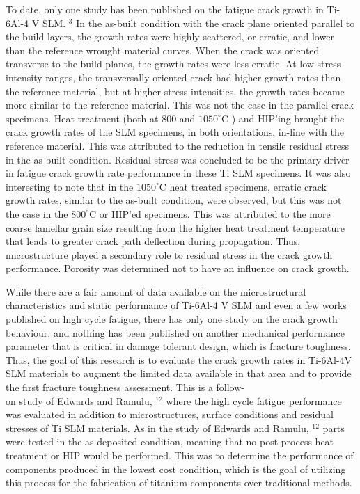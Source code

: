 \documentclass[10pt]{article}
\begin{document}
To date, only one study has been published on the fatigue crack growth in Ti-6Al-4 V SLM. ${ }^{3}$ In the as-built condition with the crack plane oriented parallel to the build layers, the growth rates were highly scattered, or erratic, and lower than the reference wrought material curves. When the crack was oriented transverse to the build planes, the growth rates were less erratic. At low stress intensity ranges, the transversally oriented crack had higher growth rates than the reference material, but at higher stress intensities, the growth rates became more similar to the reference material. This was not the case in the parallel crack specimens. Heat treatment (both at 800 and $1050^{\circ} \mathrm{C}$ ) and HIP'ing brought the crack growth rates of the SLM specimens, in both orientations, in-line with the reference material. This was attributed to the reduction in tensile residual stress in the as-built condition. Residual stress was concluded to be the primary driver in fatigue crack growth rate performance in these Ti SLM specimens. It was also interesting to note that in the $1050^{\circ} \mathrm{C}$ heat treated specimens, erratic crack growth rates, similar to the as-built condition, were observed, but this was not the case in the $800^{\circ} \mathrm{C}$ or HIP'ed specimens. This was attributed to the more coarse lamellar grain size resulting from the higher heat treatment temperature that leads to greater crack path deflection during propagation. Thus, microstructure played a secondary role to residual stress in the crack growth performance. Porosity was determined not to have an influence on crack growth.

While there are a fair amount of data available on the microstructural characteristics and static performance of Ti-6Al-4 V SLM and even a few works published on high cycle fatigue, there has only one study on the crack growth behaviour, and nothing has been published on another mechanical performance parameter that is critical in damage tolerant design, which is fracture toughness. Thus, the goal of this research is to evaluate the crack growth rates in Ti-6Al-4V SLM materials to augment the limited data available in that area and to provide the first fracture toughness assessment. This is a follow-\\
on study of Edwards and Ramulu, ${ }^{12}$ where the high cycle fatigue performance was evaluated in addition to microstructures, surface conditions and residual stresses of Ti SLM materials. As in the study of Edwards and Ramulu, ${ }^{12}$ parts were tested in the as-deposited condition, meaning that no post-process heat treatment or HIP would be performed. This was to determine the performance of components produced in the lowest cost condition, which is the goal of utilizing this process for the fabrication of titanium components over traditional methods.
\end{document}
